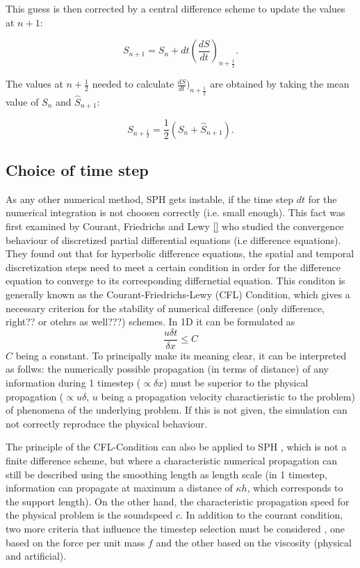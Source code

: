 \documentclass{report}
\begin{document}
This guess is then corrected by a central difference scheme to update the values at
$n+1$:

\begin{equation}
S_{n+1}=S_n+dt\left(\frac{dS}{dt}\right)_{n+\frac{1}{2}}.
\end{equation}

The values at $n+\frac{1}{2}$ needed to calculate
$\frac{dS}{dt})_{n+\frac{1}{2}}$ are obtained by taking the mean value of
$S_n$ and $\hat S_{n+1}$:

\begin{equation}
S_{n+\frac{1}{2}}=\frac{1}{2}(S_n+\hat S_{n+1}).
\end{equation}

\subsection{Choice of time step}
\label{sec:TmeStepChoice}
As any other numerical method, SPH gets instable, if the time step $dt$ for the numerical integration is not choosen correctly (i.e. small enough). 
This fact was first examined by Courant, Friedrichs and Lewy \ref{} who studied the convergence behaviour of discretized partial differential equations (i.e difference equations). They found out that for hyperbolic difference equations, the spatial and temporal discretization steps need to meet a certain condition in order for the difference equation to converge to its  corresponding differnetial equation. This conditon is generally known as the Courant-Friedrichs-Lewy (CFL) Condition, which gives a necessary criterion for the stability of numerical difference (only difference, right?? or otehrs as well???) schemes. 
In 1D it can be formulated as
\begin{equation}
 \frac{u\delta t}{\delta x}\leq C
\end{equation}
$C$ being a constant.
To principally make its meaning clear, it can be interpreted as follws:
the numerically possible propagation (in terms of distance) of any information during 1 timestep ($\propto\delta x$) must be superior to the physical propagation ($\propto u\delta$, $u$ being a propagation velocity charactieristic to the problem) of phenomena of the underlying problem. If this is not given, the simulation can not correctly reproduce the physical behaviour. 

The principle of the CFL-Condition can also be applied to SPH \cite{Monaghan1989}, which is not a finite difference scheme, but where a characteristic numerical propagation can still be described using the smoothing length as length scale (in 1 timestep, information can propagate at maximum a distance of $\kappa h$, which corresponds to the support length). On the other hand, the characteristic propagation speed for the physical problem is the soundspeed $c$. 
In addition to the courant condition, two more criteria that influence the timestep selection must be considered \cite{Monaghan1992}, one based on the force per unit mass $f$ and the other based on the viscosity (physical and artificial).
\end{document}
